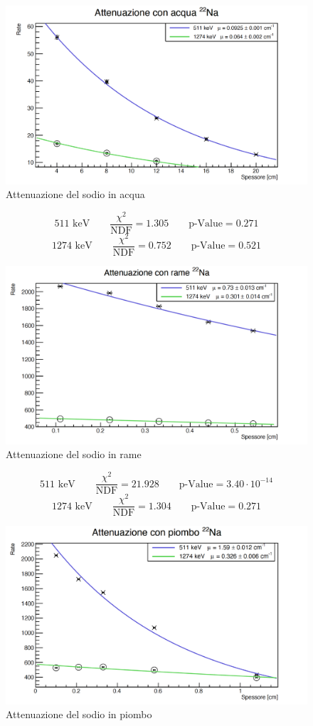 \documentclass[a4paper,10pt]{article}
\newcommand*{\unit}[1]{\ensuremath{\mathrm{\,#1}}}
\begin{document}
\begin{figure}[H]
    \centering
    \includegraphics[scale=0.45]{grafici/attenuazionesodioacqua}
    \caption{Attenuazione del sodio in acqua}
\end{figure}
$$
	511\, \unit{keV} \qquad \frac{\chi^2}{\textrm{NDF}}  = 1.305 \qquad \textrm{p-Value} = 0.271
$$
$$
	1274\, \unit{keV} \qquad \frac{\chi^2}{\textrm{NDF}}  = 0.752 \qquad \textrm{p-Value} = 0.521
$$
\begin{figure}[H]
    \centering
    \includegraphics[scale=0.45]{grafici/attenuazionesodiorame}
    \caption{Attenuazione del sodio in rame}
\end{figure}
$$
	511\, \unit{keV} \qquad \frac{\chi^2}{\textrm{NDF}}   = 21.928 \qquad \textrm{p-Value} = 3.40\cdot 10^{-14}
$$
$$
	1274\, \unit{keV} \qquad \frac{\chi^2}{\textrm{NDF}}   = 1.304 \qquad \textrm{p-Value} = 0.271
$$
\begin{figure}[H]
    \centering
    \includegraphics[scale=0.45]{grafici/attenuazionesodiopiombo}
    \caption{Attenuazione del sodio in piombo}
\end{figure}
\end{document}
